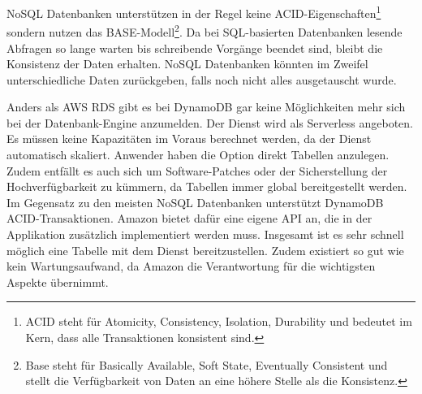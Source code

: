 NoSQL Datenbanken unterstützen in der Regel keine ACID-Eigenschaften\footnote{ACID steht für Atomicity, Consistency, Isolation, Durability und bedeutet im Kern, dass
alle Transaktionen konsistent sind.} sondern nutzen das BASE-Modell\footnote{Base steht für Basically Available, Soft State, Eventually Consistent und
stellt die Verfügbarkeit von Daten an eine höhere Stelle als die Konsistenz.}.
Da bei SQL-basierten Datenbanken lesende Abfragen so lange warten bis schreibende Vorgänge beendet sind, bleibt die Konsistenz der Daten erhalten.
NoSQL Datenbanken könnten im Zweifel unterschiedliche Daten zurückgeben, falls noch nicht alles ausgetauscht wurde. \cite[]{Datenbankvergleich}

Anders als AWS RDS gibt es bei DynamoDB gar keine Möglichkeiten mehr sich bei der Datenbank-Engine anzumelden. Der Dienst wird als Serverless angeboten.
Es müssen keine Kapazitäten im Voraus berechnet werden, da der Dienst automatisch skaliert.
Anwender haben die Option direkt Tabellen anzulegen.
Zudem entfällt es auch sich um Software-Patches oder der Sicherstellung der Hochverfügbarkeit zu kümmern, da Tabellen immer global bereitgestellt werden.
Im Gegensatz zu den meisten NoSQL Datenbanken unterstützt DynamoDB ACID-Transaktionen. Amazon bietet dafür eine eigene API an, die in der Applikation zusätzlich
implementiert werden muss. Insgesamt ist es sehr schnell möglich eine Tabelle mit dem Dienst bereitzustellen. Zudem existiert so gut wie kein Wartungsaufwand,
da Amazon die Verantwortung für die wichtigsten Aspekte übernimmt.\cite[]{DynamoDB}

